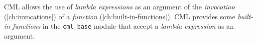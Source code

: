 CML allows the use of \emph{lambda expressions}
as an argument of the \emph{invocation} (\ref{ch:invocations})
of a \emph{function} (\ref{ch:built-in-functions}).
CML provides some \emph{built-in functions} in the \verb|cml_base| module
that accept a \emph{lambda expression} as an argument.
